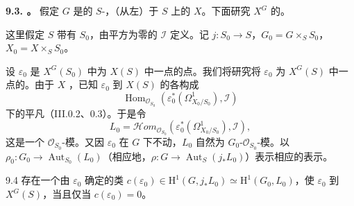 \textbf{9.3. 。} 假定 $G$ 是的 $S$-，（从左）于 $S$ 上的 $X$。下面研究 $X^G$ 的。

这里假定 $S$ 带有 $S_0$，由平方为零的 $\mathcal I$ 定义。记 $j:S_0\to S$，$G_0=G\times_SS_0$，$X_0=X\times_SS_0$。

设 $\varepsilon_0$ 是 $X^G(S_0)$ 中为 $X(S)$ 中一点的点。我们将研究将 $\varepsilon_0$ 为 $X^G(S)$ 中一点的。由于 $X$ ，已知 $\varepsilon_0$ 到 $X(S)$ 的各构成
\[
\operatorname{Hom}_{\mathcal O_{S_0}}(\varepsilon_0^*(\Omega^1_{X_0/S_0}),\mathcal I)
\]
下的平凡（III.0.2、0.3）。于是令
\[
L_0=\mathcal H\!om_{\mathcal O_{S_0}}(\varepsilon_0^*(\Omega^1_{X_0/S_0}),\mathcal I),
\]
这是一个 $\mathcal O_{S_0}$-模。又因 $\varepsilon_0$ 在 $G$ 下不动，$L_0$ 自然为 $G_0$-$\mathcal O_{S_0}$-模。以 $\rho_0:G_0\to\operatorname{Aut}_{S_0}(L_0)$（相应地，$\rho:G\to\operatorname{Aut}_S(j_*L_0)$）表示相应的表示。
\begin{SGAresult}{}{9.4}
存在一个由 $\varepsilon_0$ 确定的类 $c(\varepsilon_0)\in\mathrm H^1(G,j_*L_0)\simeq\mathrm H^1(G_0,L_0)$，使 $\varepsilon_0$ 到 $X^G(S)$，当且仅当 $c(\varepsilon_0)=0$。
\end{SGAresult}
